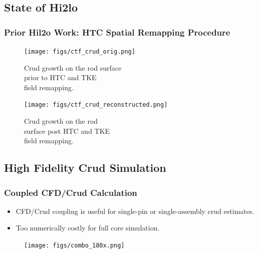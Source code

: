 \documentclass[t, pdftex]{beamer}
\begin{document}
\subsection*{State of Hi2lo}
\begin{frame}
\frametitle{Prior Hil2o Work: HTC Spatial Remapping Procedure}
\begin{figure}[!htbp]
\centering
\begin{minipage}{.5\textwidth}
    \texttt{[image: figs/ctf\_crud\_orig.png]}
    \caption{\centering \scriptsize{ Crud growth on the rod surface \\ prior to HTC and TKE \\ field remapping.}}
    \label{fig:crud_pre_map}
\end{minipage}%
\begin{minipage}{.5\textwidth}
    \vspace{-5pt}
    \texttt{[image: figs/ctf\_crud\_reconstructed.png]}
    \caption{\centering \scriptsize Crud growth on the rod \\ surface post HTC and TKE \\ field remapping.}
    \label{fig:crud_post_map}
\end{minipage}
\end{figure}
\cite{salko17}
\end{frame}

\subsection*{High Fidelity Crud Simulation}
\begin{frame}
\frametitle{Coupled CFD/Crud Calculation}
\vspace{-18pt}
\scriptsize{
    \begin{itemize}
    \item CFD/Crud coupling is useful for single-pin or single-assembly crud estimates.
    \item Too numerically costly for full core simulation.
    \end{itemize}
}
\begin{figure}[]
\centering
\texttt{[image: figs/combo\_180x.png]}
\label{cfd_crud}
\end{figure}
\cite{slattery16}
\end{frame}
\end{document}
